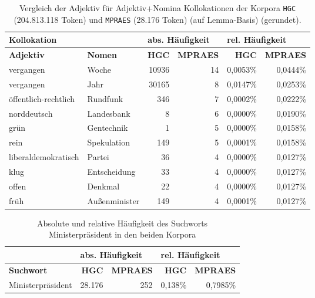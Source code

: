 \documentclass[%
	type=document,%
  	style=article,%
  	media=print,
  	pages=oneside,%
  	prefixLecturer=Dozenten:,
  	author=multiple,
]{unihildesheim} %
\begin{document}
\begin{table}[!hpb]
\begin{tabularx}{\textwidth}{llrrrr}
		\toprule
		\multicolumn{2}{l}{\textbf{Kollokation}} & \multicolumn{2}{l}{\textbf{abs.
		Häufigkeit}} & \multicolumn{2}{l}{\textbf{rel. Häufigkeit}} \\
		\midrule
		\textbf{Adjektiv} & \textbf{Nomen} & \textbf{HGC} & \textbf{MPRAES}
		&	\textbf{HGC} & \textbf{MPRAES} \\
		\midrule
		vergangen & Woche & 10936 & 14 & 0,0053\% & 0,0444\%\\
		vergangen & Jahr & 30165 & 8 & 0,0147\% & 0,0253\%\\
		öffentlich-rechtlich & Rundfunk & 346 & 7 & 0,0002\% & 0,0222\%\\
		norddeutsch & Landesbank & 8 & 6 & 0,0000\% & 0,0190\%\\
		grün & Gentechnik & 1 & 5 & 0,0000\% & 0,0158\%\\
		rein & Spekulation & 149 & 5 & 0,0001\% & 0,0158\%\\
		liberaldemokratisch & Partei & 36 & 4 & 0,0000\% & 0,0127\%\\
		klug & Entscheidung & 33 & 4 & 0,0000\% & 0,0127\%\\
		offen & Denkmal & 22 & 4 & 0,0000\% & 0,0127\%\\
		früh & Außenminister & 149 & 4 & 0,0001\% & 0,0127\%\\
		\bottomrule
	\end{tabularx}
	\caption{Vergleich der Adjektiv für Adjektiv+Nomina Kollokationen der
	Korpora \texttt{HGC} (204.813.118 Token) und \texttt{MPRAES} (28.176 Token)
	(auf Lemma-Basis) (gerundet).}
	\label{tab:compare_adj_n}
\end{table}

\begin{table}[htpb]\label{t}
	\center
	\begin{tabularx}{0.8\textwidth}{lrrrr}
		\toprule
		& \multicolumn{2}{l}{\textbf{abs. Häufigkeit}} &
		\multicolumn{2}{l}{\textbf{rel. Häufigkeit}} \\
		\midrule
		\textbf{Suchwort} & \textbf{HGC} & \textbf{MPRAES} & \textbf{HGC}
		&	\textbf{MPRAES} \\		
		Ministerpräsident & 28.176 & 252 & 0,138\% & 0,7985\% \\
		\bottomrule
	\end{tabularx}
	\caption{Absolute und relative Häufigkeit des Suchworts Ministerpräsident in
	den beiden Korpora}
	\label{tab:undefined}
\end{table}
\end{document}
